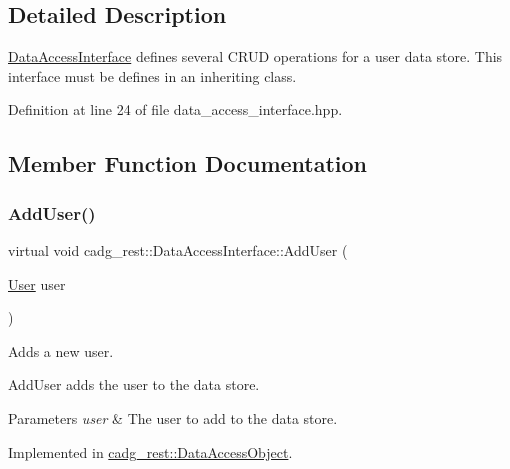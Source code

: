 \subsection{Detailed Description}
\mbox{\hyperlink{classcadg__rest_1_1_data_access_interface}{Data\+Access\+Interface}} defines several C\+R\+UD operations for a user data store. This interface must be defines in an inheriting class. 

Definition at line 24 of file data\+\_\+access\+\_\+interface.\+hpp.



\subsection{Member Function Documentation}
\mbox{\label{classcadg__rest_1_1_data_access_interface_a625cb7ba6f4637e3157acda84f81eae9}} 
\subsubsection{\texorpdfstring{AddUser()}{AddUser()}}
{\footnotesize\ttfamily virtual void cadg\+\_\+rest\+::\+Data\+Access\+Interface\+::\+Add\+User (\begin{DoxyParamCaption}\item[{\mbox{\hyperlink{structcadg__rest_1_1_user}{User}}}]{user }\end{DoxyParamCaption})\hspace{0.3cm}{\ttfamily [pure virtual]}}



Adds a new user. 

Add\+User adds the user to the data store.


\begin{DoxyParams}{Parameters}
{\em user} & The user to add to the data store. \\
\hline
\end{DoxyParams}


Implemented in \mbox{\hyperlink{classcadg__rest_1_1_data_access_object_a6d80c563e1cd526791fa69f32cd1d896}{cadg\+\_\+rest\+::\+Data\+Access\+Object}}.

\mbox{\label{classcadg__rest_1_1_data_access_interface_a9df9cb8876073f42e7e54ada41eec3b3}} 
